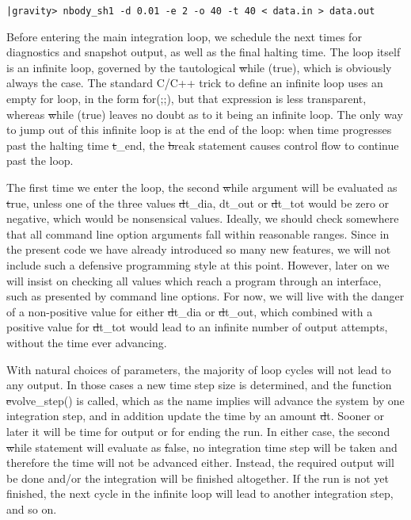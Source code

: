 \begin{small}
\begin{verbatim}
|gravity> nbody_sh1 -d 0.01 -e 2 -o 40 -t 40 < data.in > data.out
\end{verbatim}
\end{small}

Before entering the main integration loop, we schedule the next
times for diagnostics and snapshot output, as well as the final
halting time.  The loop itself is an infinite loop, governed by
the tautological {\st while (true)}, which is obviously always the
case.  The standard C/C++ trick to define an infinite loop uses an
empty for loop, in the form {\st for(;;)}, but that expression is
less transparent, whereas {\st while (true)} leaves no doubt as to it
being an infinite loop.  The only way to jump out of this infinite
loop is at the end of the loop: when time progresses past the halting
time {\st t\_end}, the {\st break} statement causes control flow to
continue past the loop.

The first time we enter the loop, the second {\st while} argument will
be evaluated as {\st true}, unless one of the three values {\st dt\_dia,
dt\_out} or {\st dt\_tot} would be zero or negative, which would be 
nonsensical values.  Ideally, we should check somewhere that all
command line option arguments fall within reasonable ranges.  Since in
the present code we have already introduced so many new features, we
will not include such a defensive programming style at this point.
However, later on we will insist on checking all values which reach a
program through an interface, such as presented by command line options.
For now, we will live with the danger of a non-positive value for either
{\st dt\_dia} or {\st dt\_out}, which combined with a positive value for
{\st dt\_tot} would lead to an infinite number of output attempts,
without the time ever advancing.

With natural choices of parameters, the majority of loop cycles will
not lead to any output.  In those cases a new time step size is
determined, and the function {\st evolve\_step()} is called, which as
the name implies will advance the system by one integration step, and
in addition update the time by an amount {\st dt}.  Sooner or later it
will be time for output or for ending the run.  In either case, the
second {\st while} statement will evaluate as {\st false}, no
integration time step will be taken and therefore the time will not be
advanced either.  Instead, the required output will be done and/or the
integration will be finished altogether.  If the run is not yet
finished, the next cycle in the infinite loop will lead to another
integration step, and so on.

